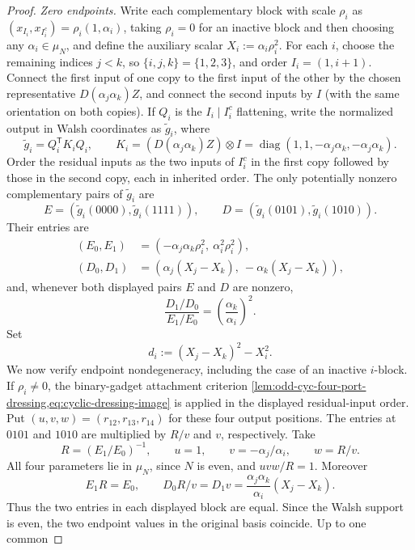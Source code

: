 \documentclass[11pt,letterpaper,onecolumn]{article}
\theoremstyle{plain}
\theoremstyle{definition}
\theoremstyle{remark}
\newcommand{\diag}{\operatorname{diag}}
\begin{document}
\begin{proof}
\emph{Zero endpoints.}
Write each complementary block with scale \(\rho_i\) as
\((x_{I_i},x_{I_i^c})=\rho_i(1,\alpha_i)\), taking \(\rho_i=0\)
for an inactive block and then choosing any \(\alpha_i\in\mu_N\), and define the auxiliary scalar
\(X_i:=\alpha_i\rho_i^2\).  For each \(i\), choose the remaining
indices \(j<k\), so \(\{i,j,k\}=\{1,2,3\}\), and order
\(I_i=(1,i+1)\).  Connect the first input
of one copy to the first input of the other by the chosen representative
\(D(\alpha_j\alpha_k)Z\), and connect the second inputs by \(I\) (with the
same orientation on both copies).  If \(Q_i\) is the \(I_i\mid I_i^c\)
flattening, write the normalized output in Walsh coordinates as \(\widetilde g_i\), where
\[
 \widetilde g_i=Q_i^{\mathsf T}K_iQ_i,\qquad
 K_i=(D(\alpha_j\alpha_k)Z)\otimes I
     =\diag(1,1,-\alpha_j\alpha_k,-\alpha_j\alpha_k).
\]
Order the residual inputs as the two inputs of \(I_i^c\) in the first copy
followed by those in the second copy, each in inherited order.  The only
potentially nonzero complementary pairs of \(\widetilde g_i\) are
\[
 E=(\widetilde g_i(0000),\widetilde g_i(1111)),
 \qquad
 D=(\widetilde g_i(0101),\widetilde g_i(1010)).
\]
Their entries are
\begin{equation*}
 \begin{aligned}
  (E_0,E_1)
    &=(-\alpha_j\alpha_k\rho_i^2,\ \alpha_i^2\rho_i^2),\\
  (D_0,D_1)
    &=(\alpha_j(X_j-X_k),\ -\alpha_k(X_j-X_k)),
 \end{aligned}
\end{equation*}
and, whenever both displayed pairs \(E\) and \(D\) are nonzero,
\[
 \frac{D_1/D_0}{E_1/E_0}=\left(\frac{\alpha_k}{\alpha_i}\right)^2.
\]
Set
\[
 d_i:=(X_j-X_k)^2-X_i^2.
\]
We now verify endpoint nondegeneracy, including the case of an inactive
\(i\)-block.  If \(\rho_i\ne0\), the binary-gadget attachment criterion
\cref{lem:odd-cyc-four-port-dressing,eq:cyclic-dressing-image} is applied
in the displayed residual-input order.  Put
\((u,v,w)=(r_{12},r_{13},r_{14})\) for these four output positions.
The entries at \(0101\) and \(1010\) are multiplied by \(R/v\)
and \(v\), respectively.  Take
\[
 R=(E_1/E_0)^{-1},
 \qquad u=1,
 \qquad v=-\alpha_j/\alpha_i,
 \qquad w=R/v.
\]
All four parameters lie in \(\mu_N\), since \(N\) is even, and
\(uvw/R=1\).  Moreover
\[
 E_1R=E_0,\qquad
 D_0R/v=D_1v=\frac{\alpha_j\alpha_k}{\alpha_i}(X_j-X_k).
\]
Thus the two entries in each displayed block are equal.  Since the Walsh
support is even, the two endpoint values in the original basis coincide. Up to one common

\end{proof}
\end{document}

